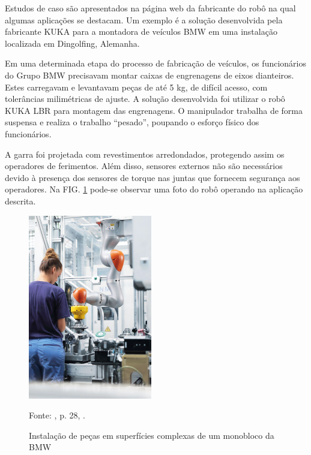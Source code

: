 
Estudos de caso são apresentados na página web da fabricante do robô na qual algumas aplicações se destacam. Um exemplo é a solução desenvolvida pela fabricante KUKA para a montadora de veículos BMW em uma instalação localizada em Dingolfing, Alemanha. 

Em uma determinada etapa do processo de fabricação de veículos, os funcionários do Grupo BMW precisavam montar caixas de engrenagens de eixos dianteiros. Estes carregavam e levantavam peças de até 5 kg, de difícil acesso, com tolerâncias milimétricas de ajuste. A solução desenvolvida foi utilizar o robô KUKA LBR para montagem das engrenagens. O manipulador trabalha de forma suspensa e realiza o trabalho ``pesado'', poupando o esforço físico dos funcionários. 


A garra foi projetada com revestimentos arredondados, protegendo assim os operadores de ferimentos. Além disso, sensores externos não são necessários devido à presença dos sensores de torque nas juntas que fornecem segurança aos operadores. Na FIG. \ref{fig:BMW} pode-se observar uma foto do robô operando na aplicação descrita. 

\begin{figure}[h]
    \centering
    \includegraphics[width=0.48\textwidth]{Imagem/BMW.jpg}
    \caption{Instalação de peças em superfícies complexas de um monobloco da BMW}
    \label{fig:BMW}
    \begin{flushleft}
    Fonte: \citeauthor{KUKAmanual}, p. 28, \citeyear{KUKAmanual}.
    \end{flushleft}
\end{figure}

